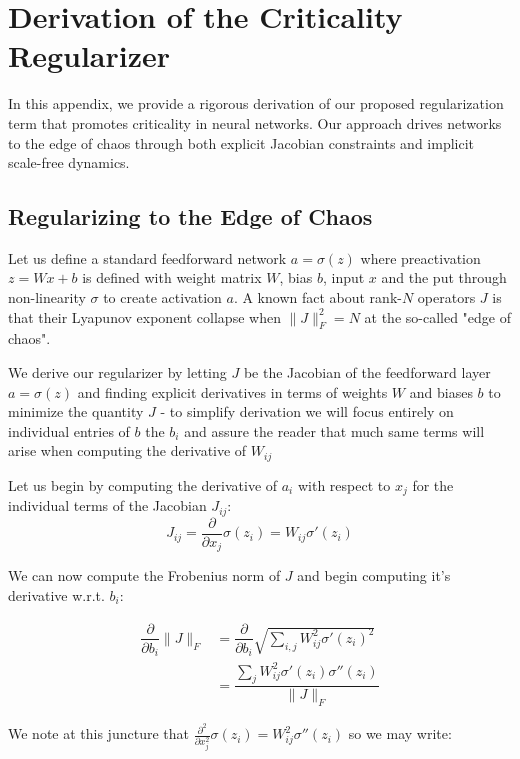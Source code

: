 \section{Derivation of the Criticality Regularizer}

In this appendix, we provide a rigorous derivation of our proposed regularization term that promotes criticality in neural networks. Our approach drives networks to the edge of chaos through both explicit Jacobian constraints and implicit scale-free dynamics.

\subsection{Regularizing to the Edge of Chaos}

Let us define a standard feedforward network $a=\sigma(z)$ where preactivation $z=Wx+b$ is defined with weight matrix $W$, bias $b$, input $x$ and the put through non-linearity $\sigma$ to create activation $a$. A known fact about rank-$N$ operators $J$ is that their Lyapunov exponent collapse when $\|J\|_F^2 = N$ at the so-called "edge of chaos".

We derive our regularizer by letting $J$ be the Jacobian of the feedforward layer $a=\sigma(z)$ and finding explicit derivatives in terms of weights $W$ and biases $b$ to minimize the quantity $J$ - to simplify derivation we will focus entirely on individual entries of $b$ the $b_i$ and assure the reader that much same terms will arise when computing the derivative of $W_{ij}$

Let us begin by computing the derivative of $a_i$ with respect to $x_j$ for the individual terms of the Jacobian $J_{ij}$:
\begin{equation}
J_{ij}=\dfrac{\partial}{\partial x_j} \sigma(z_i) = W_{ij}\sigma'(z_i)
\end{equation}

We can now compute the Frobenius norm of $J$ and begin computing it's derivative w.r.t. $b_i$:

\begin{align}
\dfrac{\partial}{\partial b_i}\|J\|_F &= \dfrac{\partial}{\partial b_i} \sqrt{\sum_{i,j}W_{ij}^2\sigma'(z_i)^2}\\
&= \dfrac{\sum_{j} W_{ij}^2 \sigma'(z_i) \sigma''(z_i)}{\|J\|_F}
\end{align}

We note at this juncture that $\frac{\partial^2}{\partial x_j^2} \sigma(z_i) = W_{ij}^2 \sigma''(z_i)$ so we may write:

